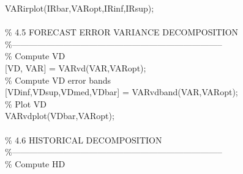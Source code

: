 \hspace{1mm}\hspace{5mm} VARirplot(IRbar,VARopt,IRinf,IRsup); \\ 
\hspace{1mm}\hspace{5mm}  \\ 
\hspace{1mm}\hspace{5mm} \textcolor{matlabgreen}{\% 4.5 FORECAST ERROR VARIANCE DECOMPOSITION }\\ 
\hspace{1mm}\hspace{5mm} \textcolor{matlabgreen}{\%--------------------------------------------------------------------------  }\\ 
\hspace{1mm}\hspace{5mm} \textcolor{matlabgreen}{\% Compute VD }\\ 
\hspace{1mm}\hspace{5mm} [VD, VAR] = VARvd(VAR,VARopt); \\ 
\hspace{1mm}\hspace{5mm} \textcolor{matlabgreen}{\% Compute VD error bands }\\ 
\hspace{1mm}\hspace{5mm} [VDinf,VDsup,VDmed,VDbar] = VARvdband(VAR,VARopt); \\ 
\hspace{1mm}\hspace{5mm} \textcolor{matlabgreen}{\% Plot VD }\\ 
\hspace{1mm}\hspace{5mm} VARvdplot(VDbar,VARopt); \\ 
\hspace{1mm}\hspace{5mm}  \\ 
\hspace{1mm}\hspace{5mm} \textcolor{matlabgreen}{\% 4.6 HISTORICAL DECOMPOSITION }\\ 
\hspace{1mm}\hspace{5mm} \textcolor{matlabgreen}{\%--------------------------------------------------------------------------  }\\ 
\hspace{1mm}\hspace{5mm} \textcolor{matlabgreen}{\% Compute HD }\\ 
